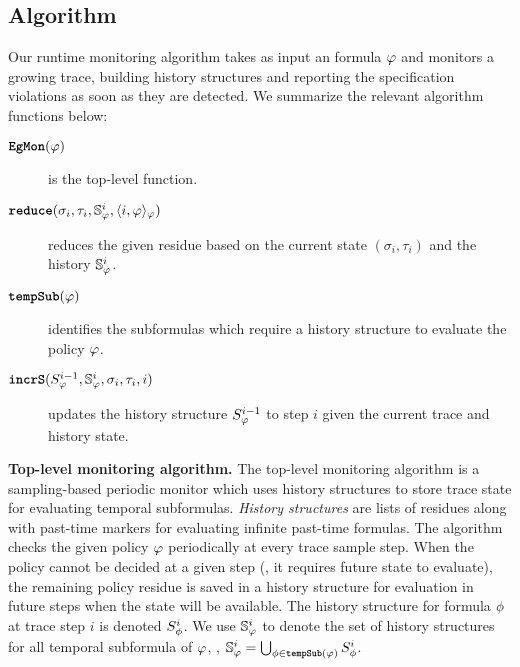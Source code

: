 

\subsection{\monitor Algorithm}
Our runtime monitoring algorithm \monitor takes as input an \planguage formula $\policy$ and monitors a growing trace, building history structures and reporting the specification violations as soon as they are detected. We summarize the relevant algorithm functions below:

\begin{description}
\item[$\monitor{}(\policy)$] is the top-level function. 
\item[$\reduce(\sigma_i, \tau_i, \histSt{i}, \rpt{i}{\policy}{\policy})$] reduces the given residue based on the current state $(\sigma_i,\tau_i)$ and the history $\histSt{i}$.
\item[$\tempSub(\policy)$] identifies the subformulas which require a history structure to evaluate the policy $\policy$.
\item[$\incrS(\histst{i-1}, \histSt{i}, \sigma_i, \tau_i, i)$] updates the history structure $\histst{i-1}$ to step $i$ given the current trace and history state.
\end{description}




\textbf{Top-level monitoring algorithm.}
The top-level monitoring algorithm \monitor is a sampling-based periodic monitor which uses history structures to store trace state for evaluating temporal subformulas. 
\emph{History structures} are lists of residues along with past-time markers for evaluating infinite past-time formulas. 
The algorithm checks the given policy $\policy$ periodically at every trace sample step. 
When the policy cannot be decided at a given step (\eg, it requires future state to evaluate), the remaining policy residue is saved in a history structure for evaluation in future steps when the state will be available. 
The history structure for formula $\policyv$ at trace step $i$ is denoted $\histst[\policyv]{i}$. 
We use $\histSt[\policy]{i}$ to denote the set of history structures for all temporal subformula of $\policy$, \ie, 
$\histSt[\policy]{i} = \bigcup_{\policyv \in \tempSub(\policy)} \histst[\policyv]{i}$.


